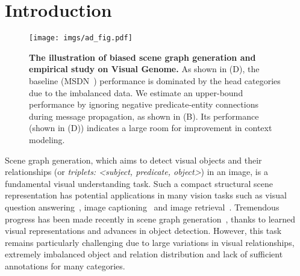 \section{Introduction}

\begin{figure}
    \centering
    \texttt{[image: imgs/ad\_fig.pdf]}
    \caption{
        \textbf{The illustration of biased scene graph generation and empirical study on Visual Genome.} As shown in (D), the baseline (MSDN~\cite{li_scene_2017}) performance is dominated by the head categories due to the imbalanced data. We estimate an upper-bound performance by ignoring negative predicate-entity connections during message propagation, as shown in (B). Its performance (shown in (D)) indicates a large room for improvement in context modeling.
    }
    \label{fig:ad}
\end{figure}




Scene graph generation, which aims to detect visual objects and their relationships (or \textit{triplets: <subject, predicate, object>}) in an image, is a fundamental visual understanding task. Such a compact structural scene representation has potential applications in many vision tasks such as visual question answering~\cite{teney2017graph, shi2019explainable, hildebrandt2020scene}, image captioning~\cite{yang2019auto} and image retrieval~\cite{johnson2015image}. 
Tremendous progress has been made recently in scene graph generation~\cite{krishna2017visual, xu_scene_2017, li_scene_2017, zellers_neural_2017, yang_graph_2018, li_factorizable_2018, tang_learning_2018,chen_knowledge-embedded_2019, gu2019scene, zhang_graphical_2019, tang_unbiased_2020, lin_gps-net_2020, wang_sketching_2020}, thanks to learned visual representations and advances in object detection.  
However, this task remains particularly challenging due to large variations in visual relationships, extremely imbalanced object and relation distribution and lack of sufficient annotations for many categories.  

